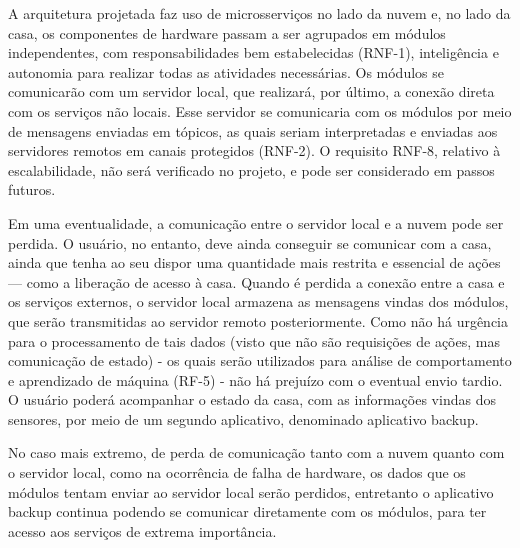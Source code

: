 A arquitetura projetada faz uso de microsserviços no lado da nuvem e, no lado da casa, os componentes de hardware passam a ser agrupados em módulos independentes, com responsabilidades bem estabelecidas (RNF-1), inteligência e autonomia para realizar todas as atividades necessárias. Os módulos se comunicarão com um servidor local, que realizará, por último, a conexão direta com os serviços não locais. Esse servidor se comunicaria com os módulos por meio de mensagens enviadas em tópicos, as quais seriam interpretadas e enviadas aos servidores remotos em canais protegidos (RNF-2). O requisito RNF-8, relativo à escalabilidade, não será verificado no projeto, e pode ser considerado em passos futuros.

Em uma eventualidade, a comunicação entre o servidor local e a nuvem pode ser perdida.  O usuário, no entanto, deve ainda conseguir se comunicar com a casa, ainda que tenha ao seu dispor uma quantidade mais restrita e essencial de ações --- como a liberação de acesso à casa. Quando é perdida a conexão entre a casa e os serviços externos, o servidor local armazena as mensagens vindas dos módulos, que serão transmitidas ao servidor remoto posteriormente. Como não há urgência para o processamento de tais dados (visto que não são requisições de ações, mas comunicação de estado) - os quais serão utilizados para análise de comportamento e aprendizado de máquina (RF-5) - não há prejuízo com o eventual envio tardio. O usuário poderá acompanhar o estado da casa, com as informações vindas dos sensores, por meio de um segundo aplicativo, denominado aplicativo backup.

No caso mais extremo, de perda de comunicação tanto com a nuvem quanto com o servidor local, como na ocorrência de falha de hardware, os dados que os módulos tentam enviar ao servidor local serão perdidos, entretanto o aplicativo backup continua podendo se comunicar diretamente com os módulos, para ter acesso aos serviços de extrema importância.
